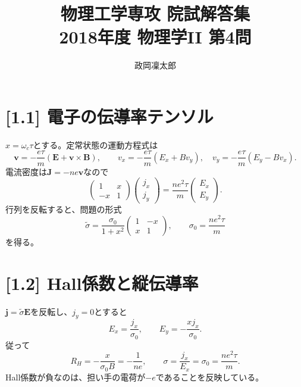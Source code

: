 \documentclass[11pt,a4paper]{article}
\title{物理工学専攻 院試解答集\\2018年度 物理学II 第4問}
\author{政岡凜太郎}
\date{}
\begin{document}
\maketitle

\section*{[1.1] 電子の伝導率テンソル}
$x=\omega_c\tau$とする。定常状態の運動方程式は
\begin{equation}
 \boldsymbol v=-\frac{e\tau}{m}(\boldsymbol E+\boldsymbol v\times\boldsymbol B),\qquad
 v_x=-\frac{e\tau}{m}(E_x+Bv_y),\quad
 v_y=-\frac{e\tau}{m}(E_y-Bv_x).
\end{equation}
電流密度は$\boldsymbol J=-ne\boldsymbol v$なので
\begin{equation}
 \begin{pmatrix}1&x\\-x&1\end{pmatrix}\begin{pmatrix}j_x\\j_y\end{pmatrix}
 =\frac{ne^2\tau}{m}\begin{pmatrix}E_x\\E_y\end{pmatrix}.
\end{equation}
行列を反転すると、問題の形式
\begin{equation}
 \boxed{\widetilde{\sigma}=\frac{\sigma_0}{1+x^2}
 \begin{pmatrix}1&-x\\x&1\end{pmatrix}},\qquad
 \boxed{\sigma_0=\frac{ne^2\tau}{m}}
\end{equation}
を得る。

\section*{[1.2] Hall係数と縦伝導率}
$\boldsymbol j=\widetilde{\sigma}\boldsymbol E$を反転し、$j_y=0$とすると
\begin{equation}
 E_x=\frac{j_x}{\sigma_0},\qquad E_y=-\frac{xj_x}{\sigma_0}.
\end{equation}
従って
\begin{equation}
 \boxed{R_H=-\frac{x}{\sigma_0B}=-\frac{1}{ne}},\qquad
 \boxed{\sigma=\frac{j_x}{E_x}=\sigma_0=\frac{ne^2\tau}{m}}.
\end{equation}
Hall係数が負なのは、担い手の電荷が$-e$であることを反映している。
\end{document}
